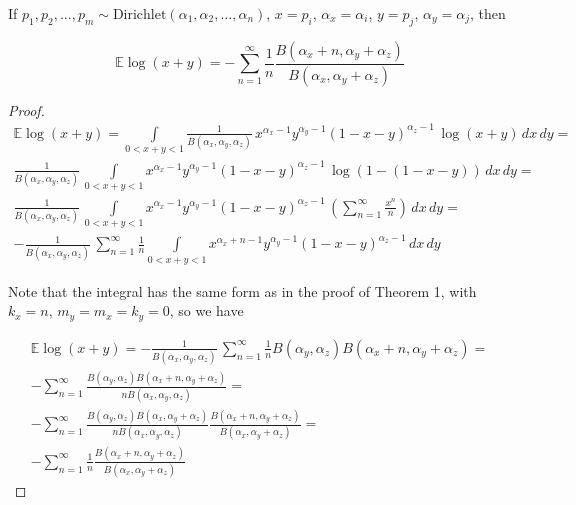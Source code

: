 \documentclass{article}
\begin{document}
\begin{theorem}
If $p_1, p_2, \ldots, p_m \sim \textrm{Dirichlet}(\alpha_1, \alpha_2, \ldots, \alpha_n)$, $x = p_i$, $\alpha_x = \alpha_i$, $y = p_j$, $\alpha_y = \alpha_j$, then

\begin{equation}
\mathbb{E}\log(x + y) = -\sum_{n=1}^{\infty}{\frac{1}{n} \frac{B(\alpha_x + n, \alpha_y + \alpha_z)}{B(\alpha_x, \alpha_y + \alpha_z)}}
\end{equation}

\begin{proof}

\begin{multline}
\mathbb{E}\log(x + y) = \int\limits_{0 < x + y < 1}{\frac{1}{B(\alpha_x, \alpha_y, \alpha_z)} \, x^{\alpha_x - 1} y^{\alpha_y - 1} (1 - x - y)^{\alpha_z - 1} \, \log(x + y) \, dx \, dy} = \\ \frac{1}{B(\alpha_x, \alpha_y, \alpha_z)} \, \int\limits_{0 < x + y < 1}{ x^{\alpha_x - 1} y^{\alpha_y - 1} (1 - x - y)^{\alpha_z - 1} \, \log(1 - (1 - x - y)) \, dx \, dy} = \\ \frac{1}{B(\alpha_x, \alpha_y, \alpha_z)} \, \int\limits_{0 < x + y < 1}{ x^{\alpha_x - 1} y^{\alpha_y - 1} (1 - x - y)^{\alpha_z - 1} \, (\sum_{n=1}^{\infty}{\frac{x^n}{n}}) \, dx \, dy} = \\ -\frac{1}{B(\alpha_x, \alpha_y, \alpha_z)} \, \sum_{n=1}^{\infty}{\frac{1}{n} \int\limits_{0 < x + y < 1}{ x^{\alpha_x + n - 1} y^{\alpha_y - 1} (1 - x - y)^{\alpha_z - 1} \, dx \, dy}}
\end{multline}

Note that the integral has the same form as in the proof of Theorem 1, with $k_x = n, \, m_y = m_x = k_y = 0$, so we have
	
\begin{multline}
\mathbb{E}\log(x + y) = -\frac{1}{B(\alpha_x, \alpha_y, \alpha_z)} \, \sum_{n=1}^{\infty}{\frac{1}{n} B(\alpha_y, \alpha_z) B(\alpha_x + n, \alpha_y + \alpha_z)} = \\
-\sum_{n=1}^{\infty}{\frac{ B(\alpha_y, \alpha_z) B(\alpha_x + n, \alpha_y + \alpha_z)}{n B(\alpha_x, \alpha_y, \alpha_z)}} = \\ -\sum_{n=1}^{\infty}{\frac{ B(\alpha_y, \alpha_z) B(\alpha_x, \alpha_y + \alpha_z)}{n B(\alpha_x, \alpha_y, \alpha_z)} \frac{B(\alpha_x + n, \alpha_y + \alpha_z)}{B(\alpha_x, \alpha_y + \alpha_z)}} = \\ -\sum_{n=1}^{\infty}{\frac{1}{n} \frac{B(\alpha_x + n, \alpha_y + \alpha_z)}{B(\alpha_x, \alpha_y + \alpha_z)}}
\end{multline}	

\end{proof}
\end{theorem}
\end{document}

